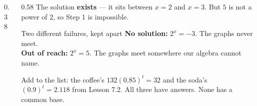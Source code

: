 \documentclass[aspectratio=169, 11pt]{beamer}
\newcommand{\lgrid}[4]{%
  \draw[step=1, linegray!45, thin] (#1,#3) grid (#2,#4);
  \draw[->, thick, charcoal] (#1,0)--(#2,0) node[below right, font=\tiny]{$x$};
  \draw[->, thick, charcoal] (0,#3)--(0,#4) node[left, font=\tiny]{$y$};}
\newcommand{\expgraph}[6]{\draw[very thick, forest, domain=#5:#6, samples=140, smooth]
  plot (\x,{(#1)*exp((#2)*((\x)-(#3)))+(#4)});}
\newcommand{\solline}[3]{\draw[goldacc, very thick] (#1,#3)--(#2,#3);}
\begin{document}
\begin{frame}[t, plain]
  \begin{columns}[T]
    \begin{column}{0.38\textwidth}
      \centering
    \end{column}
    \begin{column}{0.58\textwidth}
      \footnotesize
      The solution \textbf{exists} --- it sits between $x=2$ and $x=3$. But $5$ is not a power of $2$,
      so Step 1 is impossible.
      \vspace{4pt}
      \begin{block}{Two different failures, kept apart}
        \textbf{No solution:} $2^{x}=-3$. The graphs never meet. \\[3pt]
        \textbf{Out of reach:} $2^{x}=5$. The graphs meet somewhere our algebra cannot name.
      \end{block}
      \vspace{4pt}
      {\scriptsize Add to the list: the coffee's $132(0.85)^{t}=32$ and the soda's $(0.9)^{t}=2.118$
      from Lesson 7.2. All three have answers. None has a common base.}
    \end{column}
  \end{columns}
\end{frame}
\end{document}
